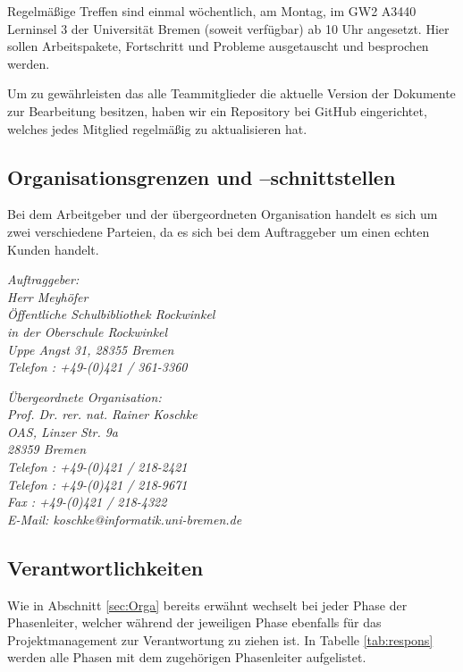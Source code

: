 \documentclass[fontsize=12pt,paper=a4,twoside]{scrartcl}
\begin{document}
Regelmäßige Treffen sind einmal wöchentlich, am Montag, im GW2 A3440 Lerninsel 3 der Universität Bremen (soweit verfügbar) ab 10 Uhr angesetzt. Hier sollen Arbeitspakete, Fortschritt und Probleme ausgetauscht und besprochen werden.

Um zu gewährleisten das alle Teammitglieder die aktuelle Version der Dokumente zur Bearbeitung besitzen, haben wir ein Repository bei GitHub eingerichtet, welches jedes Mitglied regelmäßig zu aktualisieren hat.

\subsection{Organisationsgrenzen und --schnittstellen}

Bei dem Arbeitgeber und der übergeordneten Organisation handelt es sich um zwei verschiedene Parteien, da es sich bei dem Auftraggeber um einen echten Kunden handelt.

{\em Auftraggeber:\\
	Herr Meyhöfer\\
	Öffentliche Schulbibliothek Rockwinkel\\
	in der Oberschule Rockwinkel\\
	Uppe Angst 31, 28355 Bremen\\
	Telefon : +49-(0)421 / 361-3360\\
}

{\em Übergeordnete Organisation:\\ 
	Prof. Dr. rer. nat. Rainer Koschke\\
	OAS, Linzer Str. 9a\\
	28359 Bremen\\
	Telefon : +49-(0)421 / 218-2421\\
	Telefon : +49-(0)421 / 218-9671\\
	Fax : +49-(0)421 / 218-4322\\
	E-Mail: koschke@informatik.uni-bremen.de
}


\subsection{Verantwortlichkeiten}
\label{sec:verantwortlichkeiten}

Wie in Abschnitt \ref{sec:Orga} bereits erwähnt wechselt bei jeder Phase der Phasenleiter, welcher während der jeweiligen Phase ebenfalls für das Projektmanagement zur Verantwortung zu ziehen ist. In Tabelle \ref{tab:respons} werden alle Phasen mit dem zugehörigen Phasenleiter aufgelistet.
\end{document}
